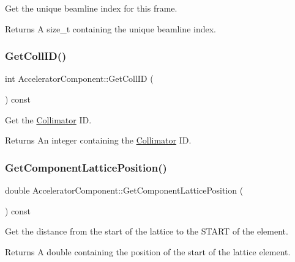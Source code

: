 Get the unique beamline index for this frame. \begin{DoxyReturn}{Returns}
A size\+\_\+t containing the unique beamline index. 
\end{DoxyReturn}
\mbox{\label{classAcceleratorComponent_a6454158847b9cd68e5b9b0272aa19ecd}} 
\subsubsection{\texorpdfstring{Get\+Coll\+I\+D()}{GetCollID()}}
{\footnotesize\ttfamily int Accelerator\+Component\+::\+Get\+Coll\+ID (\begin{DoxyParamCaption}{ }\end{DoxyParamCaption}) const\hspace{0.3cm}{\ttfamily [inline]}}

Get the \hyperlink{classCollimator}{Collimator} ID. \begin{DoxyReturn}{Returns}
An integer containing the \hyperlink{classCollimator}{Collimator} ID. 
\end{DoxyReturn}
\mbox{\label{classAcceleratorComponent_a8283a65382ca795b19448448abba245a}} 
\subsubsection{\texorpdfstring{Get\+Component\+Lattice\+Position()}{GetComponentLatticePosition()}}
{\footnotesize\ttfamily double Accelerator\+Component\+::\+Get\+Component\+Lattice\+Position (\begin{DoxyParamCaption}{ }\end{DoxyParamCaption}) const\hspace{0.3cm}{\ttfamily [inline]}}

Get the distance from the start of the lattice to the S\+T\+A\+RT of the element. \begin{DoxyReturn}{Returns}
A double containing the position of the start of the lattice element. 
\end{DoxyReturn}
\mbox{\label{classAcceleratorComponent_ae9b86c05ea3b351d5e69683db6cde3b6}} 

